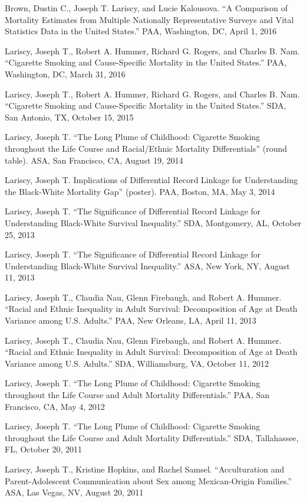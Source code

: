 \documentclass[11pt,]{article}
\begin{document}
Brown, Dustin C., Joseph T. Lariscy, and Lucie Kalousova. ``A Comparison
of Mortality Estimates from Multiple Nationally Representative Surveys
and Vital Statistics Data in the United States.'' PAA, Washington, DC,
April 1, 2016

Lariscy, Joseph T., Robert A. Hummer, Richard G. Rogers, and Charles B.
Nam. ``Cigarette Smoking and Cause-Specific Mortality in the United
States.'' PAA, Washington, DC, March 31, 2016

Lariscy, Joseph T., Robert A. Hummer, Richard G. Rogers, and Charles B.
Nam. ``Cigarette Smoking and Cause-Specific Mortality in the United
States.'' SDA, San Antonio, TX, October 15, 2015

Lariscy, Joseph T. ``The Long Plume of Childhood: Cigarette Smoking
throughout the Life Course and Racial/Ethnic Mortality Differentials''
(round table). ASA, San Francisco, CA, August 19, 2014

Lariscy, Joseph T. Implications of Differential Record Linkage for
Understanding the Black-White Mortality Gap'' (poster). PAA, Boston, MA,
May 3, 2014

Lariscy, Joseph T. ``The Significance of Differential Record Linkage for
Understanding Black-White Survival Inequality.'' SDA, Montgomery, AL,
October 25, 2013

Lariscy, Joseph T. ``The Significance of Differential Record Linkage for
Understanding Black-White Survival Inequality.'' ASA, New York, NY,
August 11, 2013

Lariscy, Joseph T., Claudia Nau, Glenn Firebaugh, and Robert A. Hummer.
``Racial and Ethnic Inequality in Adult Survival: Decomposition of Age
at Death Variance among U.S. Adults.'' PAA, New Orleans, LA, April 11,
2013

Lariscy, Joseph T., Claudia Nau, Glenn Firebaugh, and Robert A. Hummer.
``Racial and Ethnic Inequality in Adult Survival: Decomposition of Age
at Death Variance among U.S. Adults.'' SDA, Williamsburg, VA, October
11, 2012

Lariscy, Joseph T. ``The Long Plume of Childhood: Cigarette Smoking
throughout the Life Course and Adult Mortality Differentials.'' PAA, San
Francisco, CA, May 4, 2012

Lariscy, Joseph T. ``The Long Plume of Childhood: Cigarette Smoking
throughout the Life Course and Adult Mortality Differentials.'' SDA,
Tallahassee, FL, October 20, 2011

Lariscy, Joseph T., Kristine Hopkins, and Rachel Samsel. ``Acculturation
and Parent-Adolescent Communication about Sex among Mexican-Origin
Families.'' ASA, Las Vegas, NV, August 20, 2011
\end{document}
